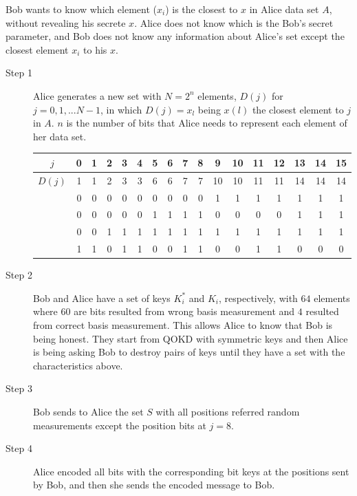 Bob wants to know which element ($x_{i}$) is the closest to $x$ in Alice data set $A$, without revealing his secrete $x$. Alice does not know which is the Bob's secret parameter, and Bob does not know any information about Alice's set except the closest element $x_{i}$ to his $x$.

\begin{description}
  \item[Step 1] Alice generates a new set with $N=2^{n}$ elements, $D(j)$ for $j=0,1,...N-1$, in which $D(j)=x_{l}$ being $x(l)$ the closest element to $j$ in $A$. $n$ is the number of bits that Alice needs to represent each element of her data set.
      
       \begin{table}[hbt]
        \centering
        \begin{tabular}{c|c|c|c|c|c|c|c|c|c|c|c|c|c|c|c|c}
        \textbf{$j$}    & 0 & 1 & 2 & 3 & 4 & 5 & 6 & 7 & 8 & 9  & 10 & 11 & 12 & 13 & 14 & 15 \\ \hline
        \textbf{$D(j)$} & 1 & 1 & 2 & 3 & 3 & 6 & 6 & 7 & 7 & 10 & 10 & 11 & 11 & 14 & 14 & 14 \\ \hline
                        & 0 & 0 & 0 & 0 & 0 & 0 & 0 & 0 & 0 & 1  & 1  & 1  & 1  & 1  & 1  & 1  \\
                        & 0 & 0 & 0 & 0 & 0 & 1 & 1 & 1 & 1 & 0  & 0  & 0  & 0  & 1  & 1  & 1  \\
                        & 0 & 0 & 1 & 1 & 1 & 1 & 1 & 1 & 1 & 1  & 1  & 1  & 1  & 1  & 1  & 1  \\
                        & 1 & 1 & 0 & 1 & 1 & 0 & 0 & 1 & 1 & 0  & 0  & 1  & 1  & 0  & 0  & 0
        \end{tabular}
  \end{table}
  
  \item[Step 2]  Bob and Alice have a set of keys $K_{i}^*$ and $K_{i}$, respectively, with $64$ elements where $60$ are bits resulted from wrong basis measurement and $4$ resulted from correct basis measurement. This allows Alice to know that Bob is being honest. They start from QOKD with symmetric keys and then Alice is being asking Bob to destroy pairs of keys until they have a set with the characteristics above.
      
  \item[Step 3] Bob sends to Alice the set $S$ with all positions referred random measurements except the position bits at $j=8$.
  
  \item[Step 4] Alice encoded all bits with the corresponding bit keys at the positions sent by Bob, and then she sends the encoded message to Bob.
  

\end{description}
